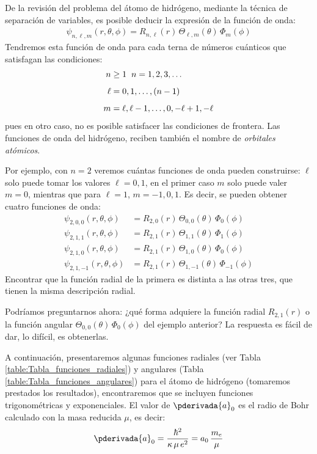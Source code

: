 De la revisión del problema del átomo de hidrógeno, mediante la técnica de separación de variables, es posible deducir la expresión de la función de onda:
\begin{align}
\psi_{n, \ell, m} (r, \theta, \phi) = R _{n, \ell} (r) \, \Theta_{\ell, m} (\theta) \, \Phi_{m} (\phi)
\label{ec:ecuacion_07_25}
\end{align}
Tendremos esta función de onda para cada terna de números cuánticos que satisfagan las condiciones:
\begin{align}
\begin{aligned}
n &\geq 1 \hspace{0.2cm} n = 1, 2, 3, \ldots \\[0.5em]
\ell &= 0, 1, \ldots, (n - 1) \\[0.5em]
m &= \ell, \ell - 1, \ldots, 0, - \ell + 1, -\ell
\end{aligned}
\label{eq:ecuacion_07_26}
\end{align}
pues en otro caso, no es posible satisfacer las condiciones de frontera. Las funciones de onda del hidrógeno, reciben también el nombre de \emph{orbitales atómicos}.
\par
Por ejemplo, con $n = 2$ veremos cuántas funciones de onda pueden construirse: $\ell$ solo puede tomar los valores $\ell = 0, 1$, en el primer caso $m$ solo puede valer $m = 0$, mientras que para $\ell = 1$, $m = -1, 0, 1$. Es decir, se pueden obtener cuatro funciones de onda:
\begin{align*}
\psi_{2, 0, 0} (r, \theta, \phi) &= R_{2, 0} (r) \, \Theta_{0, 0} (\theta) \, \Phi_{0} (\phi) \\[0.5em]
\psi_{2, 1, 1} (r, \theta, \phi) &= R_{2, 1} (r) \, \Theta_{1, 1} (\theta) \, \Phi_{1} (\phi) \\[0.5em]
\psi_{2, 1, 0} (r, \theta, \phi) &= R_{2, 1} (r) \, \Theta_{1, 0} (\theta) \, \Phi_{0} (\phi) \\[0.5em]
\psi_{2, 1, -1} (r, \theta, \phi) &= R_{2, 1} (r) \, \Theta_{1, -1} (\theta) \, \Phi_{-1} (\phi)
\end{align*}
Encontrar que la función radial de la primera es distinta a las otras tres, que tienen la misma descripción radial.
\par
Podríamos preguntarnos ahora: ¿qué forma adquiere la función radial $R_{2, 1} (r)$ o la función angular $\Theta_{0, 0} (\theta) \, \Phi_{0} (\phi)$ del ejemplo anterior? La respuesta es fácil de dar, lo difícil, es obtenerlas.
\par
A continuación, presentaremos algunas funciones radiales (ver Tabla \ref{table:Tabla_funciones_radiales}) y angulares (Tabla \ref{table:Tabla_funciones_angulares}) para el átomo de hidrógeno (tomaremos prestados los resultados), encontraremos que se incluyen funciones trigonométricas y exponenciales. El valor de $\pderivada{a}_{0}$ es el radio de Bohr calculado con la masa reducida $\mu$, es decir:
\begin{align}
\pderivada{a}_{0} = \dfrac{\hbar^{2}}{\kappa \, \mu \, e^{2}} = a_{0} \, \dfrac{m_{e}}{\mu}
\label{eq:ecuacion_07_27}
\end{align}

